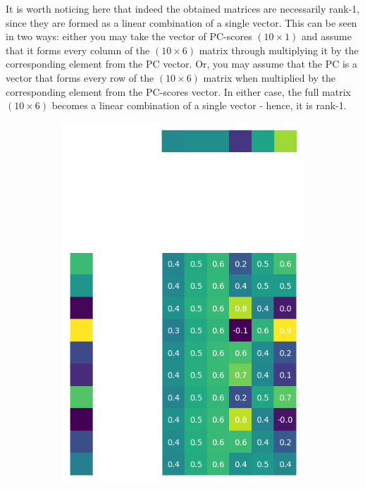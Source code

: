 \documentclass[10pt,twocolumn]{article}
\begin{document}
It is worth noticing here that indeed the obtained matrices are necessarily rank-1, since they are formed as a linear combination of a single vector. This can be seen in two ways: either you may take the vector of PC-scores $(10 \times 1)$ and assume that it forms every column of the $(10 \times 6)$ matrix through multiplying it by the corresponding element from the PC vector. Or, you may assume that the PC is a vector that forms every row of the $(10 \times 6)$ matrix when multiplied by the corresponding element from the PC-scores vector. In either case, the full matrix $(10 \times 6)$ becomes a linear combination of a single vector - hence, it is rank-1.

\begin{figure}[H]
\begin{subfigure}[t]{.15\textwidth}
\centering
\includegraphics[scale=.2]{DWGs/random-matrix-reconstruction-PCs-1.png}
\caption{ }
\end{subfigure}
\begin{subfigure}[t]{.15\textwidth}
\centering

\end{subfigure}
\end{figure}
\end{document}
